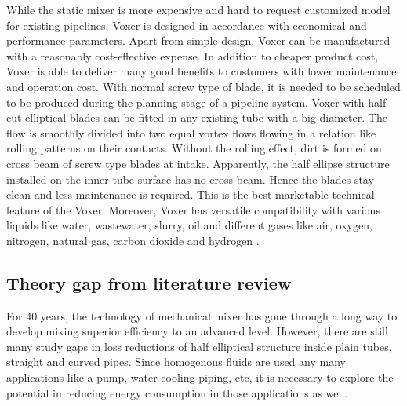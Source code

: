While the static mixer is more expensive and hard to request customized model for existing pipelines, Voxer is designed in accordance with economical and performance parameters. Apart from simple design, Voxer can be manufactured with a reasonably cost-effective expense. In addition to cheaper product cost, Voxer is able to deliver many good benefits to customers with lower maintenance and operation cost.
With normal screw type of blade, it is needed to be scheduled to be produced during the planning stage of a pipeline system. Voxer with half cut elliptical blades can be fitted in any existing tube with a big diameter. The flow is smoothly divided into two equal vortex flows flowing in a relation like rolling patterns on their contacts. Without the rolling effect, dirt is formed on cross beam of screw type blades at intake. Apparently, the half ellipse structure installed on the inner tube surface has no cross beam. Hence the blades stay clean and less maintenance is required. This is the best marketable technical feature of the Voxer. Moreover, Voxer has versatile compatibility with various liquids like water, wastewater, slurry, oil and different gases like air, oxygen, nitrogen, natural gas, carbon dioxide and hydrogen \cite{voxer:article}. 

\subsection{Theory gap from literature review}

For 40 years, the technology of mechanical mixer has gone through a long way to develop mixing superior efficiency to an advanced level. However, there are still many study gaps in loss reductions of half elliptical structure inside plain tubes, straight and curved pipes. Since homogenous fluids are used any many applications like a pump, water cooling piping, etc, it is necessary to explore the potential in reducing energy consumption in those applications as well.  
\clearpage %
